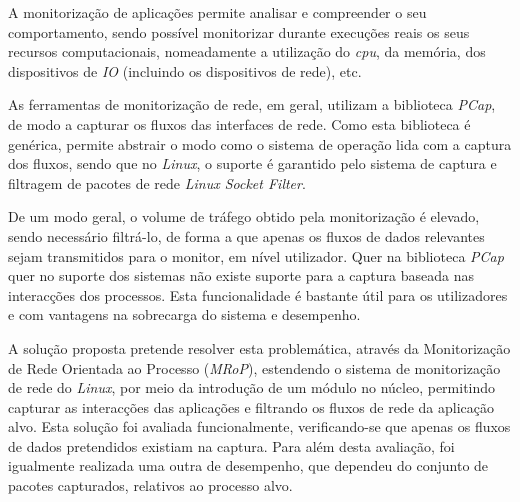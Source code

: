 \abstractPT

A monitorização de aplicações permite analisar e compreender o seu comportamento, sendo possível monitorizar durante execuções reais os seus recursos computacionais, nomeadamente a utilização do \textit{cpu}, da memória, dos dispositivos de \textit{IO} (incluindo os dispositivos de rede), etc. 

As ferramentas de monitorização de rede, em geral, utilizam a biblioteca \textit{PCap}, de modo a capturar os fluxos das interfaces de rede.
Como esta biblioteca é genérica, permite abstrair o modo como o sistema de operação lida com a captura dos fluxos, sendo que no \textit{Linux}, o suporte é garantido pelo sistema de captura e filtragem de pacotes de rede \textit{Linux Socket Filter}.


De um modo geral, o volume de tráfego obtido pela monitorização é elevado, sendo necessário filtrá-lo, de forma a que apenas os fluxos de dados relevantes sejam transmitidos para o monitor, em nível utilizador.
Quer na biblioteca \textit{PCap} quer no suporte dos sistemas não existe suporte para a captura baseada nas interacções dos processos.
Esta funcionalidade é bastante útil para os utilizadores e com vantagens na sobrecarga do sistema e desempenho.

A solução proposta pretende resolver esta problemática, através da Monitorização de Rede Orientada ao Processo (\textit{MRoP}), estendendo o sistema de monitorização de rede do \textit{Linux}, por meio da introdução de um módulo no núcleo, permitindo capturar as interacções das aplicações e filtrando os fluxos de rede da aplicação alvo.
Esta solução foi avaliada funcionalmente, verificando-se que apenas os fluxos de dados pretendidos existiam na captura.
Para além desta avaliação, foi igualmente realizada uma outra de desempenho, que dependeu do conjunto de pacotes capturados, relativos ao processo alvo.






